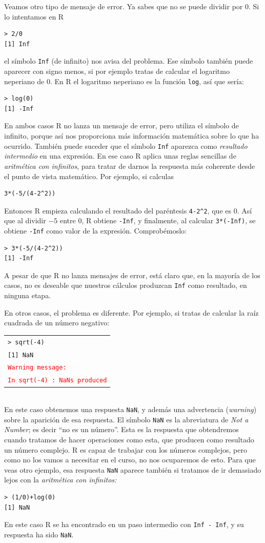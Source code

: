 \documentclass[10pt,a4paper]{article}\usepackage[]{graphicx}\usepackage[]{color}
\newcounter {cont01}
\begin{document}
Veamos otro tipo de mensaje de error. Ya sabes  que no se puede dividir por $0$. Si lo intentamos en R
\begin{verbatim}
> 2/0
[1] Inf
\end{verbatim}
el símbolo {\tt Inf} (de infinito) nos avisa del problema. Ese símbolo también puede aparecer con signo menos, si por ejemplo tratas de calcular el logaritmo neperiano de $0$. En R el logaritmo neperiano es la función {\tt log}, así que sería:
\begin{verbatim}
> log(0)
[1] -Inf
\end{verbatim}
En ambos casos R no lanza un mensaje de error, pero utiliza el símbolo de infinito, porque así nos proporciona más información matemática sobre lo que ha ocurrido. También puede suceder que el símbolo {\tt Inf} aparezca como {\em resultado intermedio} en una expresión. En ese caso R aplica unas reglas sencillas de {\em aritmética con infinitos}, para tratar de darnos la respuesta más coherente desde el punto de vista matemático. Por ejemplo, si calculas
\begin{verbatim}
3*(-5/(4-2^2))
\end{verbatim}
Entonces R empieza calculando el resultado del paréntesis {\tt 4-2\^{}2}, que es $0$. Así que al dividir $-5$ entre $0$, R obtiene {\tt -Inf}, y finalmente, al calcular {\tt 3*(-Inf)}, se obtiene {\tt -Inf} como valor de la expresión. Comprobémoslo:
\begin{verbatim}
> 3*(-5/(4-2^2))
[1] -Inf
\end{verbatim}
A pesar de que R no lanza mensajes de error, está claro que, en la mayoría de los casos,  no es deseable que nuestros cálculos produzcan {\tt Inf} como resultado, en ninguna etapa.

En otros casos, el problema es diferente. Por ejemplo, si tratas de calcular la raíz cuadrada de un número negativo:\\

\begin{tabular}{l}
{\tt > sqrt(-4)}\\
{\tt [1] NaN}\\
\textcolor{red}{\tt Warning message:{}}\\
\textcolor{red}{\tt In sqrt(-4) : NaNs produced{}}
\end{tabular}\\
En este caso obtenemos una respuesta {\tt NaN}, y además una advertencia ({\em warning}) sobre la aparición de esa respuesta. El símbolo {\tt NaN} es la abreviatura de {\em Not a Number}; es decir ``no es un número''. Esta es la respuesta que obtendremos cuando tratamos de hacer operaciones como esta, que producen como resultado un número complejo. R es capaz de trabajar con los números complejos, pero como no los vamos a necesitar en el curso, no nos ocuparemos de esto. Para que veas otro ejemplo, esa respuesta {\tt NaN} aparece también si tratamos de ir demasiado lejos con la {\em aritmética con infinitos:}
\begin{verbatim}
> (1/0)+log(0)
[1] NaN
\end{verbatim}
En este caso R se ha encontrado en un paso intermedio con {\tt Inf - Inf}, y su respuesta ha sido {\tt NaN}.\\
\end{document}
